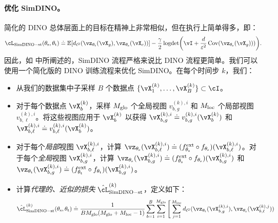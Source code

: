 \documentclass[../../book-main_zh.tex]{subfiles}
\begin{document}
\paragraph{优化 SimDINO。} 简化的 DINO 总体层面上的目标在精神上非常相似，但在执行上简单得多，即：
\begin{equation}\label{eq:simdino_loss_teacherstudent}
    \cL_{\simdino-\student\teacher}(\theta_{\student}, \theta_{\teacher}) \doteq  \Ex\rs{d_{\ell^{2}}(\vz_{\theta_{\teacher}}(\vX_{g}), \vz_{\theta_{\student}}(\vX_{c}))} - \frac{\gamma}{2}\logdet\rp{\vI + \frac{d}{\eps^{2}}\Cov(\vz_{\theta_{\student}}(\vX_{g})))}.
\end{equation}
因此，如  中所阐述的，SimDINO 流程严格来说比 DINO 流程更简单。我们可以使用一个简化版的 DINO 训练流程来优化 SimDINO。在每个时间步 \(k\)，我们：
\begin{itemize}
    \item 从我们的数据集中子采样 \(B\) 个数据点 \(\{\vX_{1}^{(k)}, \dots, \vX_{B}^{(k)}\} \subset \cI\)。
    \item 对于每个数据点 \(\vX_{b}^{(k)}\)，采样 \(M_{\mathrm{glo}}\) 个全局视图 \(v_{b, g}^{(k), i}\) 和 \(M_{\mathrm{loc}}\) 个局部视图 \(v_{b, \ell}^{(k), i}\)。将这些视图应用于 \(\vX_{b}^{(k)}\) 以获得 \(\vX_{b, g}^{(k), i} \doteq v_{b, g}^{(k), i}(\vX_{b}^{(k)})\) 和 \(\vX_{b, \ell}^{(k), i} \doteq v_{b, \ell}^{(k), i}(\vX_{b}^{(k)})\)。
    \item 对于每个\textit{局部}视图 \(\vX_{b, \ell}^{(k), i}\)，计算 \(\vz_{\theta_{\student}}(\vX_{b, \ell}^{(k), i}) \doteq (f_{\theta_{\student}}^{\ext} \circ f_{\theta_{\student}})(\vX_{b, \ell}^{(k), i})\)。对于每个\textit{全局}视图 \(\vX_{b, g}^{(k), i}\)，计算 \(\vz_{\theta_{\student}}(\vX_{b, g}^{(k), i}) \doteq (f_{\theta_{\student}}^{\ext} \circ f_{\theta_{\student}})(\vX_{b, g}^{(k), i})\) 和 \(\vz_{\theta_{\teacher}}(\vX_{b, g}^{(k), i}) \doteq (f_{\theta_{\teacher}}^{\ext} \circ f_{\theta_{\teacher}})(\vX_{b, g}^{(k), i})\)。
    \item 计算\textit{代理的、近似的损失} \(\hat{\cL}_{\simdino-\student\teacher}^{(k)}\)，定义如下：
    \begin{align}\label{eq:simdino_loss_teacherstudent_empirical}
        &\hat{\cL}_{\simdino{}-\student\teacher}^{(k)}(\theta_{\student}, \theta_{\teacher}) \doteq
        \frac{1}{BM_{\glo}(M_{\glo} + M_{\loc} - 1)}\sum_{b = 1}^{B}\sum_{i = 1}^{M_{\glo}}\Bigg[\sum_{j = 1}^{M_{\loc}}d_{\ell^{2}}(\vz_{\theta_{\teacher}}(\vX_{b, g}^{(k), i}), \vz_{\theta_{\student}}(\vX_{b, \ell}^{(k), j})) \\ 

\end{align}
\end{itemize}
\end{document}
